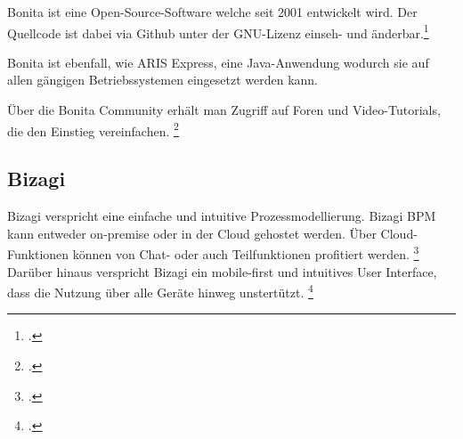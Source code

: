 Bonita ist eine Open-Source-Software welche seit 2001 entwickelt wird. Der
Quellcode ist dabei via Github unter der GNU-Lizenz einseh- und
änderbar.\footcite{bonitasource}

\begin{figure}[H]
\begin{minipage}{\linewidth}
\begin{center}
\end{center}
\end{minipage}
\end{figure}

Bonita ist ebenfall, wie ARIS Express, eine Java-Anwendung wodurch sie auf allen
gängigen Betriebssystemen eingesetzt werden kann.

Über die Bonita Community erhält man Zugriff auf Foren und Video-Tutorials, die
den Einstieg vereinfachen. \footcite{bonitalernen}

\subsection{Bizagi}

Bizagi verspricht eine einfache und intuitive Prozessmodellierung.
Bizagi BPM kann entweder on-premise oder in der Cloud gehostet werden. 
Über Cloud-Funktionen können von Chat- oder auch Teilfunktionen
profitiert werden. \footcite{bizagi} Darüber hinaus verspricht Bizagi ein
mobile-first und intuitives User Interface, dass die Nutzung über alle Geräte
hinweg unstertützt. \footcite{bizagimobile}


